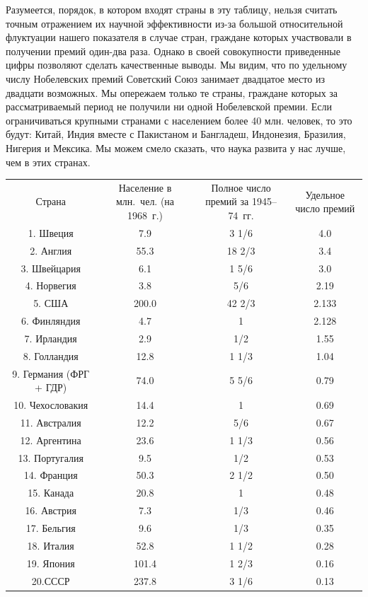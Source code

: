 \documentclass{book}
\begin{document}
Разумеется, порядок, в котором входят страны в эту табли­цу, нельзя считать точным отражением их научной эффективности из-за 
большой относительной флуктуации нашего показателя в случае стран, граждане которых участвовали в получении премий один-два 
раза. Однако в своей совокупности приведенные цифры позволяют сделать качественные выводы. Мы видим, что по удельному числу 
Нобелевских премий Советский Союз занимает двадцатое место из двадцати возможных. Мы опережаем только те страны, граждане 
которых за рассматриваемый период не получили ни одной Нобелевской премии. Если ограничиваться крупными странами с населением 
более 40 млн. человек, то это будут: Китай, Индия вместе с Пакистаном и Бангладеш, Индонезия, Бразилия, Нигерия и Мексика. Мы 
можем смело сказать, что наука развита у нас лучше, чем в этих странах.
\begin{tabular}{ c c c c }
Страна & Население в млн.~чел. (на 1968~г.) & Полное число премий за 1945--74~гг. & Удельное число премий \\
1. Швеция & 7.9 & 3 1/6 & 4.0  \\
2. Англия & 55.3 & 18 2/3 & 3.4 \\
3. Швейцария & 6.1 & 1 5/6 & 3.0 \\
4. Норвегия & 3.8 & 5/6 & 2.19 \\
5. США & 200.0 & 42 2/3 & 2.133 \\
6. Финляндия & 4.7 & 1 & 2.128 \\
7. Ирландия & 2.9 & 1/2 & 1.55 \\
8. Голландия & 12.8 & 1 1/3 & 1.04 \\
9. Германия (ФРГ + ГДР) & 74.0 & 5 5/6 & 0.79 \\
10. Чехословакия & 14.4 & 1 & 0.69 \\
11. Австралия & 12.2 & 5/6 & 0.67 \\
12. Аргентина & 23.6 & 1 1/3 & 0.56 \\
13. Португалия & 9.5 & 1/2 & 0.53 \\
14. Франция & 50.3 & 2 1/2 & 0.50 \\
15. Канада & 20.8 & 1 & 0.48 \\
16. Австрия & 7.3 & 1/3 & 0.46 \\
17. Бельгия & 9.6 & 1/3 & 0.35 \\
18. Италия & 52.8 & 1 1/2 & 0.28 \\
19. Япония & 101.4 & 1 2/3 & 0.16 \\
20.СССР & 237.8 & 3 1/6 & 0.13 \\
\end{tabular}
\end{document}
